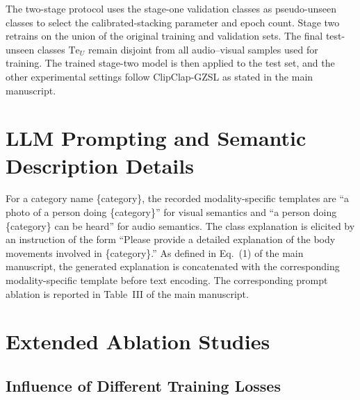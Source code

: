 \documentclass[10pt,journal,twoside]{IEEEtran}
\begin{document}
The two-stage protocol uses the stage-one validation classes as pseudo-unseen classes to select the calibrated-stacking parameter and epoch count. Stage two retrains on the union of the original training and validation sets. The final test-unseen classes $\mathrm{Te}_{U}$ remain disjoint from all audio--visual samples used for training. The trained stage-two model is then applied to the test set, and the other experimental settings follow ClipClap-GZSL as stated in the main manuscript.

\section{LLM Prompting and Semantic Description Details}

For a category name \{category\}, the recorded modality-specific templates are ``a photo of a person doing \{category\}'' for visual semantics and ``a person doing \{category\} can be heard'' for audio semantics. The class explanation is elicited by an instruction of the form ``Please provide a detailed explanation of the body movements involved in \{category\}.'' As defined in Eq.~(1) of the main manuscript, the generated explanation is concatenated with the corresponding modality-specific template before text encoding. The corresponding prompt ablation is reported in Table~III of the main manuscript.


\section{Extended Ablation Studies}

\subsection{Influence of Different Training Losses}
\end{document}
